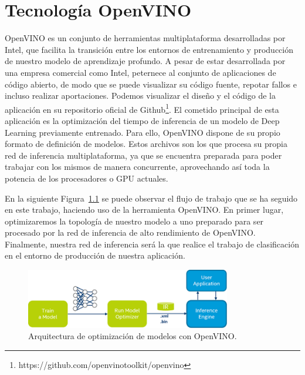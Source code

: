\cleardoublepage
\mbox{}

\lstset{
language=Python,
basicstyle=\small\sffamily,
numbers=left,
numberstyle=\tiny,
frame=tb,
columns=fullflexible,
showstringspaces=false
}

\chapter{Tecnología OpenVINO}
\label{ch:chapter3}

OpenVINO es un conjunto de herramientas multiplataforma desarrolladas por Intel, que facilita la transición entre los entornos de entrenamiento y producción de nuestro modelo de aprendizaje profundo.
A pesar de estar desarrollada por una empresa comercial como Intel, peternece al conjunto de aplicaciones de código abierto, de modo que se puede visualizar su código fuente, repotar fallos e incluso realizar aportaciones.
Podemos visualizar el diseño y el código de la aplicación en su repositorio oficial de Github\footnote{https://github.com/openvinotoolkit/openvino}.
El cometido principal de esta aplicación es la optimización del tiempo de inferencia de un modelo de Deep Learning previamente entrenado.
Para ello, OpenVINO dispone de su propio formato de definición de modelos.
Estos archivos son los que procesa su propia red de inferencia multiplataforma, ya que se encuentra preparada para poder trabajar con los mismos de manera concurrente, aprovechando así toda la potencia de los procesadores o GPU actuales.

En la siguiente Figura~\ref{fig:Arquitectura de optimización de modelos con OpenVINO} se puede observar el flujo de trabajo que se ha seguido en este trabajo, haciendo uso de la herramienta OpenVINO. En primer lugar, optimizaremos la topología de nuestro modelo a uno preparado para ser procesado por la red de inferencia de alto rendimiento de OpenVINO\@. Finalmente, nuestra red de inferencia será la que realice el trabajo de clasificación en el entorno de producción de nuestra aplicación.



\begin{figure}
    \centering
    \includegraphics[width=0.8\textwidth]{images/chapter3/openvino_workflow.png}
    \caption{Arquitectura de optimización de modelos con OpenVINO.}
    \label{fig:Arquitectura de optimización de modelos con OpenVINO}
\end{figure}


